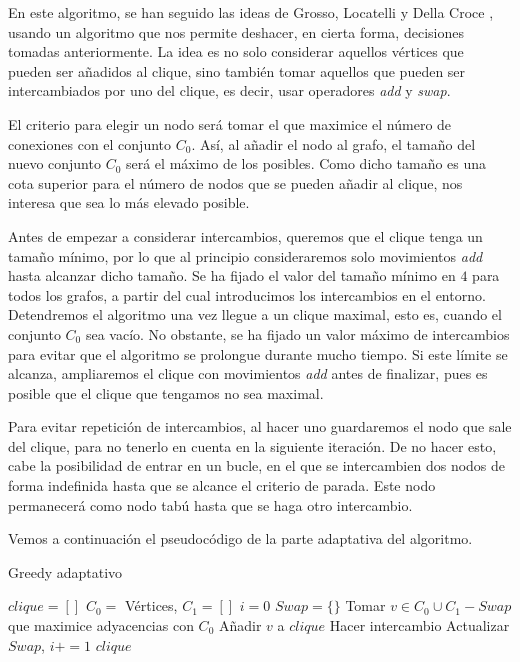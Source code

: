 En este algoritmo, se han seguido las ideas de Grosso, Locatelli y Della Croce
\citep{grosso:2004}, usando un algoritmo que nos permite deshacer, en cierta forma,
decisiones tomadas anteriormente. La idea es no solo considerar aquellos vértices
que pueden ser añadidos al clique, sino también tomar aquellos que pueden ser
intercambiados por uno del clique, es decir, usar operadores \textit{add} y \textit{swap}.

El criterio para elegir un nodo será tomar el que maximice el número de conexiones
con el conjunto $C_0$. Así, al añadir el nodo al grafo, el tamaño del nuevo conjunto
$C_0$ será el máximo de los posibles. Como dicho tamaño es una cota superior para
el número de nodos que se pueden añadir al clique, nos interesa que sea lo más
elevado posible.

Antes de empezar a considerar intercambios, queremos que el clique tenga un tamaño
mínimo, por lo que al principio consideraremos solo movimientos \textit{add} hasta
alcanzar dicho tamaño. Se ha fijado el valor del tamaño mínimo en $4$ para todos
los grafos, a partir del cual introducimos los intercambios en el entorno.
Detendremos el algoritmo una vez llegue a un clique maximal, esto es, cuando el
conjunto $C_0$ sea vacío. No obstante, se ha fijado un valor máximo de intercambios
para evitar que el algoritmo se prolongue durante mucho tiempo. Si este límite se
alcanza, ampliaremos el clique con movimientos \textit{add} antes de finalizar, pues
es posible que el clique que tengamos no sea maximal.

Para evitar repetición de intercambios, al hacer uno guardaremos el nodo que sale
del clique, para no tenerlo en cuenta en la siguiente iteración. De no hacer esto,
cabe la posibilidad de entrar en un bucle, en el que se intercambien dos nodos
de forma indefinida hasta que se alcance el criterio de parada. Este nodo permanecerá
como nodo tabú hasta que se haga otro intercambio.

Vemos a continuación el pseudocódigo de la parte adaptativa del algoritmo.

\begin{algorithm}[H]
\caption{Greedy adaptativo}
  \begin{algorithmic}
  \State $clique = [ ]$
  \State $C_0 = $ Vértices, $C_1 = [ ]$
  \State $i = 0$
  \State $Swap = \{\}$
  \Repeat
    \State Tomar $v \in C_0 \cup C_1 - Swap$ que maximice adyacencias con $C_0$
      \State Añadir $v$ a $clique$
    \Else
      \State Hacer intercambio
      \State Actualizar $Swap$, $i += 1$
    \EndIf
  \Return $clique$
  \EndFunction
  \end{algorithmic}
\end{algorithm}


